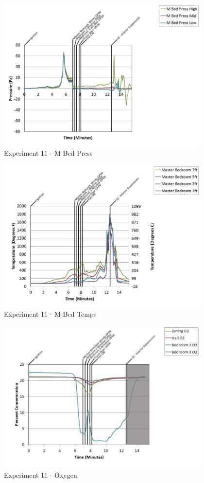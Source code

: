 \documentclass{article}
\begin{document}
\begin{appendices}
	\clearpage

	\begin{figure}[h!]
		\centering
		\includegraphics[height=3.05in]{0_Images/Results_Charts/Exp_11_Charts/MBedPress.pdf}
		\caption{Experiment 11 - M Bed Press}
	\end{figure}
 

	\begin{figure}[h!]
		\centering
		\includegraphics[height=3.05in]{0_Images/Results_Charts/Exp_11_Charts/MBedTemps.pdf}
		\caption{Experiment 11 - M Bed Temps}
	\end{figure}
 
	\clearpage

	\begin{figure}[h!]
		\centering
		\includegraphics[height=3.05in]{0_Images/Results_Charts/Exp_11_Charts/Oxygen.pdf}
		\caption{Experiment 11 - Oxygen}
	\end{figure}
 


\end{appendices}
\end{document}
